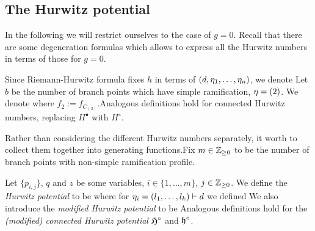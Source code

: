 \documentclass[10pt,handout]{beamer} %
\begin{document}
\subsection{The Hurwitz potential}

\begin{frame}

In the following we will restrict ourselves to the case of $g=0$. Recall that there are some degeneration formulas which allows to express all the Hurwitz numbers in terms of those for $g=0$.\pause  

Since Riemann-Hurwitz formula fixes $h$ in terms of $(d,\eta_1,\ldots,\eta_n)$, we denote
\pause
Let $b$ be the number of branch points which have simple ramification, \ie $\eta=(2)$. We denote
\vspace{-10pt}
where $f_2:=f_{C_{(2)}}$.\pause Analogous definitions hold for connected Hurwitz numbers, replacing $H^\bullet$ with $H^\circ$. 

\end{frame}

\begin{frame}

Rather than considering the different Hurwitz numbers separately, it worth to collect them together into generating functions.\pause Fix $m\in\mathbb Z_{\geq0}$ to be the number of branch points with non-simple ramification profile.

\begin{definition}
	Let $\{p_{i,j}\}$, $q$ and $z$ be some variables, $i\in\{1,\ldots,m\}$, $j\in\mathbb Z_{\geq0}$. We define the \emph{Hurwitz potential} to be
	where for $\eta_i=(l_1,\ldots,l_k)\vdash d$ we defined
	We also introduce the \emph{modified Hurwitz potential} to be
	\vspace{-2pt}
	Analogous definitions hold for the \emph{(modified) connected Hurwitz potential} $\mathfrak H^\circ$ and $\mathfrak h^\circ$. 
\end{definition}

\end{frame}
\end{document}
